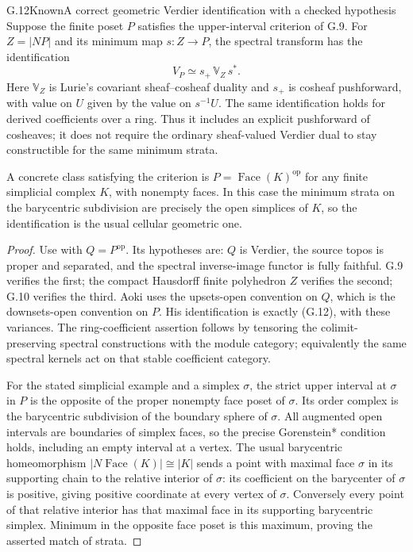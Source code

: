 \begin{claim}{G.12}{Known}{A correct geometric Verdier identification with a checked hypothesis}
Suppose the finite poset $P$ satisfies the upper-interval criterion
of G.9. For $Z=|NP|$ and its minimum map $s:Z\to P$, the
spectral transform has the identification
\[
 V_P\simeq s_+\,\mathbb V_Z\,s^*.
\tag{G.12}
\]
Here $\mathbb V_Z$ is Lurie's covariant sheaf--cosheaf duality and
$s_+$ is cosheaf pushforward, with value on $U$ given by the value
on $s^{-1}U$. The same identification holds for derived coefficients
over a ring. Thus it includes an explicit pushforward of cosheaves;
it does not require the ordinary sheaf-valued Verdier dual to stay
constructible for the same minimum strata.

A concrete class satisfying the criterion is
$P=\operatorname{Face}(K)^{\mathrm{op}}$ for any finite simplicial
complex $K$, with nonempty faces. In this case the minimum strata
on the barycentric subdivision are precisely the open simplices of
$K$, so the identification is the usual cellular geometric one.
\end{claim}
\begin{proof}
Use \citet[Theorem D, or Theorem 6.13 with Remark 6.14]{DGAoki2022}
with $Q=P^{\mathrm{op}}$. Its hypotheses are: $Q$ is Verdier,
the source topos is proper and separated, and the spectral
inverse-image functor is fully faithful. G.9 verifies the first;
the compact Hausdorff finite polyhedron $Z$ verifies the second;
G.10 verifies the third. Aoki uses the upsets-open convention
on $Q$, which is the downsets-open convention on $P$. His
identification is exactly (G.12), with these variances. The
ring-coefficient assertion follows by tensoring the colimit-preserving
spectral constructions with the module category; equivalently the
same spectral kernels act on that stable coefficient category.

For the stated simplicial example and a simplex $\sigma$, the
strict upper interval at $\sigma$ in $P$ is the opposite of the
proper nonempty face poset of $\sigma$. Its order complex is the
barycentric subdivision of the boundary sphere of $\sigma$.
All augmented open intervals are boundaries of simplex faces,
so the precise Gorenstein* condition holds, including an empty
interval at a vertex. The usual barycentric homeomorphism
$|N\operatorname{Face}(K)|\cong|K|$ sends a point with maximal
face $\sigma$ in its supporting chain to the relative interior
of $\sigma$: its coefficient on the barycenter of $\sigma$ is
positive, giving positive coordinate at every vertex of $\sigma$.
Conversely every point of that relative interior has that maximal
face in its supporting barycentric simplex. Minimum in the
opposite face poset is this maximum, proving the asserted match
of strata.
\end{proof}

